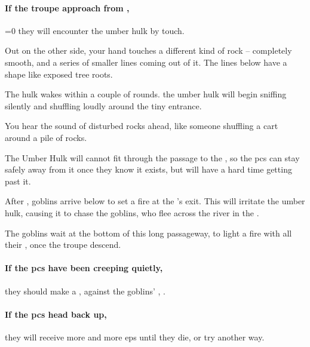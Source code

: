 \begin{multicols}{2}
\paragraph{If the troupe approach from ,}
\ifnum\value{temperature}=0
  they will encounter the umber hulk by touch.

  \begin{boxtext}
    Out on the other side, your hand touches a different kind of rock -- completely smooth, and a series of smaller lines coming out of it.
    The lines below have a shape like exposed tree roots.
  \end{boxtext}

  The hulk wakes within a couple of \glspl{round}.
\else
  the umber hulk will begin sniffing silently and shuffling loudly around the tiny entrance.

  \begin{boxtext}
    You hear the sound of disturbed rocks ahead, like someone shuffling a cart around a pile of rocks.
  \end{boxtext}
\fi

The Umber Hulk will cannot fit through the passage to the , so the \glspl{pc} can stay safely away from it once they know it exists, but will have a hard time getting past it.

\umberhulk

After , goblins arrive below to set a fire at the 's exit.
This will irritate the umber hulk, causing it to chase the goblins, who flee across the river in the .


The goblins wait at the bottom of this long passageway, to light a fire with all their \fireFuel, once the troupe descend.




\paragraph{If the \glspl{pc} have been creeping quietly,}
they should make a , against the goblins' , \tn.

\paragraph{If the \glspl{pc} head back up,}
they will receive more and more \glspl{ep} until they die, or try another way.


\end{multicols}

